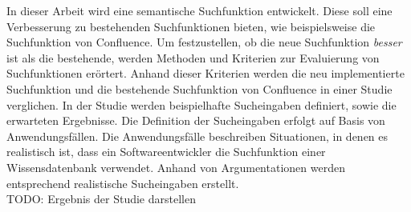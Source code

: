 In dieser Arbeit wird eine semantische Suchfunktion entwickelt.
Diese soll eine Verbesserung zu bestehenden Suchfunktionen bieten, wie beispielsweise die Suchfunktion von Confluence.
Um festzustellen, ob die neue Suchfunktion \textit{besser} ist als die bestehende, werden Methoden und Kriterien zur Evaluierung von Suchfunktionen erörtert.
Anhand dieser Kriterien werden die neu implementierte Suchfunktion und die bestehende Suchfunktion von Confluence in einer Studie verglichen.
In der Studie werden beispielhafte Sucheingaben definiert, sowie die erwarteten Ergebnisse.
Die Definition der Sucheingaben erfolgt auf Basis von Anwendungsfällen.
Die Anwendungsfälle beschreiben Situationen, in denen es realistisch ist, dass ein Softwareentwickler die Suchfunktion einer Wissensdatenbank verwendet.
Anhand von Argumentationen werden entsprechend realistische Sucheingaben erstellt.\\

TODO: Ergebnis der Studie darstellen